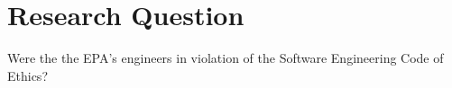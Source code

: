
\section{Research Question}
Were the the EPA's engineers in violation of the Software Engineering Code of Ethics?